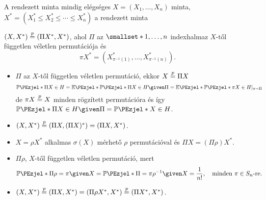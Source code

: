\documentclass[aspectratio=169,notheorems,9pt,\option]{beamer}
\begin{document}
\begin{frame}{A rendezett minta mindig elégséges}
  $X=(X_1,\dots,X_n)$ minta, $X^*=(X_1^*\leq X_2^*\leq\cdots\leq X_n^*)$ a rendezett minta

  \begin{proposition}
    $(X,X^*)\stackrel{p}{=}(\Pi X^*,X^*)$, ahol $\Pi$ az $\smallset*{1,\dots,n}$ indexhalmaz 
    $X$-től független véletlen permutációja és 
    \begin{displaymath}
      \pi X^*=(X^*_{\pi^{-1}(1)},\dots,X^*_{\pi^{-1}(n)}).
    \end{displaymath}
  \end{proposition}
  
  \begin{itemize}
    \item $\Pi$ az $X$-től független véletlen permutáció, ekkor $X\stackrel{p}{=} \Pi X$
    \begin{displaymath}
      \P{\Pi X\in H}=\E{\P{\Pi X\in H\given \Pi}}=\E{\P{\pi X\in H}|_{\pi=\Pi}}
    \end{displaymath} 
    de $\pi X\stackrel{p}{=} X$ minden rögzített permutációra és így $\P{\Pi X\in H\given \Pi}=\P{X\in H}$.
    \item $(X,X^*)\stackrel{p}{=} (\Pi X,(\Pi X)^*)=(\Pi X,X^*)$.
    \item $X=\rho X^*$ alkalmas $\sigma(X)$ mérhető $\rho$ permutációval és 
    $\Pi X=(\Pi\rho) X^*$.
    \item $\Pi\rho$, $X$-től független véletlen permutáció, mert 
    \begin{displaymath}
      \P{\Pi\rho=\pi\given X}=\P{\Pi=\pi\rho^{-1}\given X}=\frac1{n!},
      \quad\text{minden $\pi\in S_n$-re}. 
    \end{displaymath}
    \item $(X,X^*)\stackrel{p}{=}(\Pi X,X^*)=(\Pi\rho X^*,X^*)\stackrel{p}{=}(\Pi X^*,X^*)$.
  \end{itemize}
\end{frame}


\end{document}
